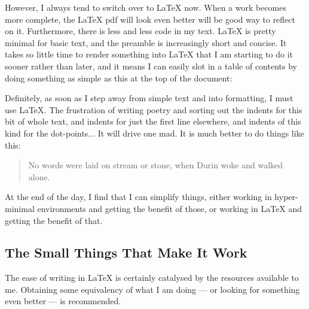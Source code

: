 \documentclass[11pt, oneside]{memoir}
\begin{document}
However, I always tend to switch over to LaTeX now. When a work becomes more complete, the LaTeX pdf will look even better will be good way to reflect on it. Furthermore, there is less and less code in my text. LaTeX is pretty minimal for basic text, and the preamble is increasingly short and concise. It takes so little time to render something into LaTeX that I am starting to do it sooner rather than later, and it means I can easily slot in a table of contents by doing something as simple as this at the top of the document:

\begin{verbatim*}
    \tableofcontents
\end{verbatim*}

Definitely, as soon as I step away from simple text and into formatting, I must use LaTeX. The frustration of writing poetry and sorting out the indents for this bit of whole text, and indents for just the first line elsewhere, and indents of this kind for the dot-points... It will drive one mad. It is much better to do things like this:

\begin{verbatim*}
    \begin{verse}
        No words were laid on stream or stone,
        when Durin woke and walked alone.
    \end{verse}
\end{verbatim*}

At the end of the day, I find that I can simplify things, either working in hyper-minimal environments and getting the benefit of those, or working in LaTeX and getting the benefit of that.

\subsection{The Small Things That Make It Work}

The ease of writing in LaTeX is certainly catalysed by the resources available to me. Obtaining some equivalency of what I am doing — or looking for something even better — is recommended.
\end{document}
